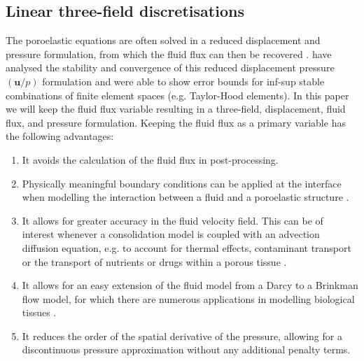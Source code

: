 \subsection{Linear three-field discretisations}
The poroelastic equations are often solved in a reduced displacement and pressure formulation, from which the fluid flux can then be recovered \citep{murad1994stability,white2008stabilized}. \citet{murad1994stability} have analysed the stability and convergence of this reduced displacement pressure $(\boldsymbol{u}/ p)$ formulation and were able to show error bounds for inf-sup stable combinations of finite element spaces (e.g. Taylor-Hood elements). In this paper we will keep the fluid flux variable resulting in a three-field, displacement, fluid flux, and pressure formulation. Keeping the fluid flux as a primary variable has the following advantages:
\begin{enumerate}[label=\roman*]
 \item It avoids the calculation of the fluid flux in post-processing. 
\item Physically meaningful boundary conditions can be applied at the interface when modelling the interaction between a fluid and a poroelastic structure \citep{badia2009coupling}.
 \item It allows for greater accuracy in the fluid velocity field. This can be of interest whenever a consolidation model is coupled with an advection diffusion equation, e.g. to account for thermal effects, contaminant transport or the transport of nutrients or drugs within a porous tissue \citep{khaled2003role}.
 \item It allows for an easy extension of the fluid model from a Darcy to a Brinkman flow model, for which there are numerous applications in modelling biological tissues \citep{khaled2003role}.
 \item It reduces the order of the spatial derivative of the pressure, allowing for a discontinuous pressure approximation without any additional penalty terms.
\end{enumerate}

